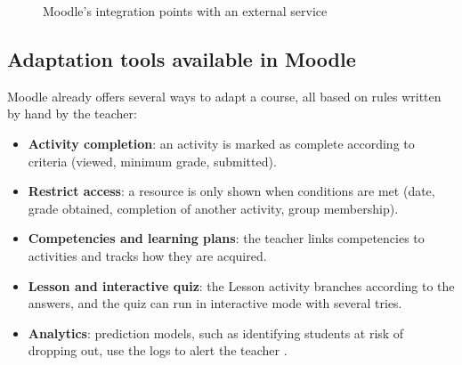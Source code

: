 \begin{figure}[htbp]
\centering
{}
\caption{Moodle's integration points with an external service}
\label{fig-moodle-integration-points}
\end{figure}

\subsection{Adaptation tools available in Moodle}
\label{subsec-moodle-adaptation}

Moodle already offers several ways to adapt a course, all based on rules
written by hand by the teacher:

\begin{itemize}
  \item \textbf{Activity completion}: an activity is marked as complete
        according to criteria (viewed, minimum grade, submitted).
  \item \textbf{Restrict access}: a resource is only shown when conditions
        are met (date, grade obtained, completion of another activity,
        group membership).
  \item \textbf{Competencies and learning plans}: the teacher links
        competencies to activities and tracks how they are acquired.
  \item \textbf{Lesson and interactive quiz}: the Lesson activity branches
        according to the answers, and the quiz can run in interactive mode
        with several tries.
  \item \textbf{Analytics}: prediction models, such as identifying
        students at risk of dropping out, use the logs to alert the
        teacher \cite{moodle_analytics}.
\end{itemize}

